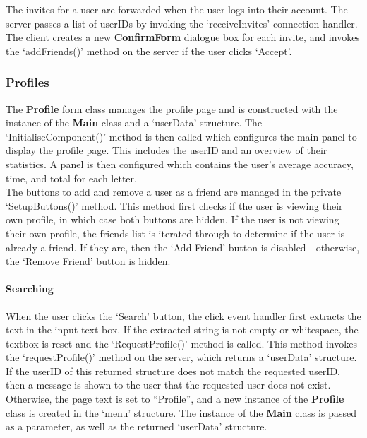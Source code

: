 \documentclass{article}
\begin{document}
The invites for a user are forwarded when the user logs into their account. The server passes a list of userIDs by invoking the `receiveInvites' connection handler. The client creates a new \textbf{ConfirmForm} dialogue box for each invite, and invokes the `addFriends()' method on the server if the user clicks `Accept'.

\subsubsection{Profiles}

The \textbf{Profile} form class manages the profile page and is constructed with the instance of the \textbf{Main} class and a `userData' structure. The `InitialiseComponent()' method is then called which configures the main panel to display the profile page. This includes the userID and an overview of their statistics. A panel is then configured which contains the user's average accuracy, time, and total for each letter. \\

The buttons to add and remove a user as a friend are managed in the private `SetupButtons()' method. This method first checks if the user is viewing their own profile, in which case both buttons are hidden. If the user is not viewing their own profile, the friends list is iterated through to determine if the user is already a friend. If they are, then the `Add Friend' button is disabled---otherwise, the `Remove Friend' button is hidden.

\paragraph{Searching\\}

When the user clicks the `Search' button, the click event handler first extracts the text in the input text box. If the extracted string is not empty or whitespace, the textbox is reset and the `RequestProfile()' method is called. This method invokes the `requestProfile()' method on the server, which returns a `userData' structure. If the userID of this returned structure does not match the requested userID, then a message is shown to the user that the requested user does not exist. Otherwise, the page text is set to ``Profile'', and a new instance of the \textbf{Profile} class is created in the `menu' structure. The instance of the \textbf{Main} class is passed as a parameter, as well as the returned `userData' structure.
\end{document}
